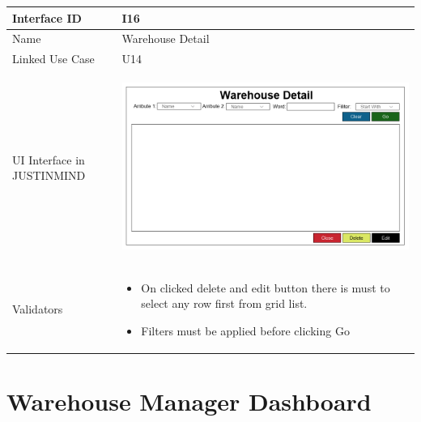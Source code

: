 \documentclass[12pt,a4paper]{report}
\begin{document}
\begin{tabular}{ | m{3cm} | m{12cm}| } \hline

Interface ID & I16  \\\hline

Name  &  Warehouse Detail \\ \hline

Linked Use Case & U14 \\ \hline

UI Interface in JUSTINMIND & \begin{center} \includegraphics[scale=0.3]{./UIs for Latex Reports/UI-016 ViewAndDelete Warehouse@1x.png}\end{center}  \\ \hline

Validators & 
\begin{itemize}
\item   On clicked delete and edit button there is must to select any row first from grid list. 
\item  Filters must be applied before clicking Go


\end{itemize}
\\ \hline

\end{tabular} 
\section{Warehouse Manager Dashboard }
\end{document}
